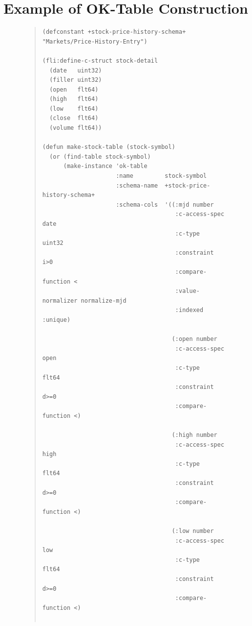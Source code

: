 \documentclass[article,oneside]{memoir}
\begin{document}
\section{Example of OK-Table Construction}
\label{OkTableConstructionSection}
\begin{figure}[!htbp]
\begin{quote}
\lstset{language=Lisp,caption=Example of OK-Table construction,label= MakeOKTableExample}
\begin{lstlisting}
(defconstant +stock-price-history-schema+  "Markets/Price-History-Entry")

(fli:define-c-struct stock-detail
  (date   uint32)
  (filler uint32)
  (open   flt64)
  (high   flt64)
  (low    flt64)
  (close  flt64)
  (volume flt64))

(defun make-stock-table (stock-symbol)
  (or (find-table stock-symbol)
      (make-instance 'ok-table
                     :name         stock-symbol
                     :schema-name  +stock-price-history-schema+
                     :schema-cols  '((:mjd number
                                      :c-access-spec    date
                                      :c-type           uint32
                                      :constraint       i>0
                                      :compare-function <
                                      :value-normalizer normalize-mjd
                                      :indexed          :unique)
                                     
                                     (:open number
                                      :c-access-spec    open
                                      :c-type           flt64
                                      :constraint       d>=0
                                      :compare-function <)
                                     
                                     (:high number
                                      :c-access-spec    high
                                      :c-type           flt64
                                      :constraint       d>=0
                                      :compare-function <)
                                     
                                     (:low number
                                      :c-access-spec    low
                                      :c-type           flt64
                                      :constraint       d>=0
                                      :compare-function <)
                                     

\end{lstlisting}
\end{quote}
\end{figure}
\end{document}
